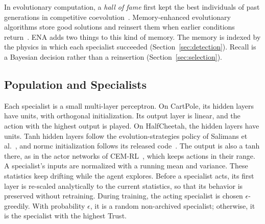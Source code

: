 In evolutionary computation, a \textit{hall of fame} first kept the best individuals of past generations in competitive coevolution~\cite{rosin1997new}. Memory-enhanced evolutionary algorithms store good solutions and reinsert them when earlier conditions return~\cite{branke1999memory}. ENA adds two things to this kind of memory. The memory is indexed by the physics in which each specialist succeeded (Section~\ref{sec:detection}). Recall is a Bayesian decision rather than a reinsertion (Section~\ref{sec:selection}).

\subsection{Population and Specialists}
Each specialist is a small multi-layer perceptron. On CartPole, its hidden layers have  units, with orthogonal initialization. Its output layer is linear, and the action with the highest output is played. On HalfCheetah, the hidden layers have  units. Tanh hidden layers follow the evolution-strategies policy of Salimans et al.~\cite{salimans2017evolution}, and normc initialization follows its released code~\cite{openai2017esstarter}. The output is also a tanh there, as in the actor networks of CEM-RL~\cite{pourchot2019cemrl}, which keeps actions in their range. A specialist's inputs are normalized with a running mean and variance. These statistics keep drifting while the agent explores. Before a specialist acts, its first layer is re-scaled analytically to the current statistics, so that its behavior is preserved without retraining. During training, the acting specialist is chosen $\epsilon$-greedily. With probability $\epsilon$, it is a random non-archived specialist; otherwise, it is the specialist with the highest Trust.


